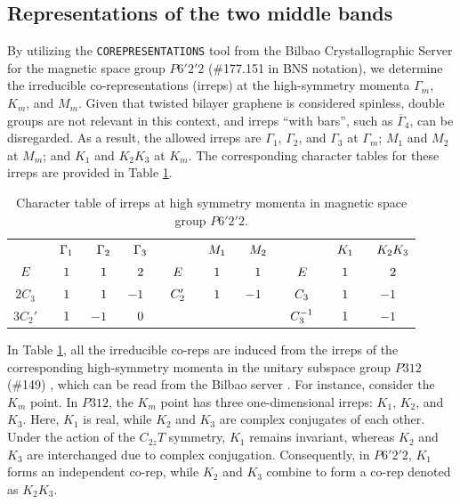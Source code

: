 \subsection{Representations of the two middle bands} \label{subsec:reps_two_middle_bands}

By utilizing the \texttt{COREPRESENTATIONS} tool from the Bilbao Crystallographic Server \cite{bilbao_1} for the magnetic space group \( P6'2'2 \) (\#177.151 in BNS notation), we determine the irreducible co-representations (irreps) at the high-symmetry momenta \(\Gamma_m\), \(K_m\), and \(M_m\). Given that twisted bilayer graphene is considered spinless, double groups are not relevant in this context, and irreps ``with bars'', such as \(\overline{\Gamma}_4\), can be disregarded. As a result, the allowed irreps are \(\Gamma_1\), \(\Gamma_2\), and \(\Gamma_3\) at \(\Gamma_m\); \(M_1\) and \(M_2\) at \(M_m\); and \(K_1\) and \(K_2K_3\) at \(K_m\). The corresponding character tables for these irreps are provided in Table \ref{tab:P6'2'2_characters}.

\begin{table}[H]
\caption{Character table of irreps at high symmetry momenta in magnetic space group $P6'2'2$.}
\centering
\begin{tabular} { c c c c | c c c | c c c }
\cline{1-10}
$\P$ & $\P \Gamma_1$ & $\P \Gamma_2$ & $\P \Gamma_3$ & $\P$ & $\P M_1$ & $\P M_2$ & $\P$ & $\P K_1$ & $\P K_2K_3$ \\
\cline{1-10}
$E$ & $\P1$ & $\P1$ & $\P2$ & $\P E$ & $\P1$ & $\P1$ & $\P E$ & $\P1$ & $\P2$ \\
$2 C_3$ & $\P1$ & $\P1$ & $ -1$ & $\P C_2'$ & $\P1$ & $ -1$ & $\P C_3$ & $\P1$ & $ -1$ \\
$3 C_2'$ & $\P1$ & $ -1$ & $\P0$ & $\P$ & $\P$ & $\P$ & $\P C_3^{-1}$ & $\P1$ & $-1$ \\
\cline{1-10}
\end{tabular}
\label{tab:P6'2'2_characters}
\end{table}

In Table \ref{tab:P6'2'2_characters}, all the irreducible co-reps are induced from the irreps of the corresponding high-symmetry momenta in the unitary subspace group \( P312 \) (\#149) \cite{all_magic_angles, bradley_representation_theory_2010}, which can be read from the Bilbao server \cite{bilbao_1}. For instance, consider the \( K_m \) point. In \( P312 \), the \( K_m \) point has three one-dimensional irreps: \( K_1 \), \( K_2 \), and \( K_3 \). Here, \( K_1 \) is real, while \( K_2 \) and \( K_3 \) are complex conjugates of each other. Under the action of the \( C_{2z}T \) symmetry, \( K_1 \) remains invariant, whereas \( K_2 \) and \( K_3 \) are interchanged due to complex conjugation. Consequently, in \( P6'2'2 \), \( K_1 \) forms an independent co-rep, while \( K_2 \) and \( K_3 \) combine to form a co-rep denoted as \( K_2K_3 \).

